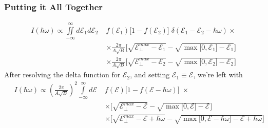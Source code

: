 \subsubsection{Putting it All Together}
\begin{align}
I(\hbar\omega) \propto \iint\limits_{-\infty}^{\infty} d\mathcal{E}_1 d\mathcal{E}_2 \;& f(\mathcal{E}_1) \Big[1-f(\mathcal{E}_2)\Big] \; \delta(\mathcal{E}_1 - \mathcal{E}_2 - \hbar\omega) \times \\ &\times \frac{2\pi}{A\sqrt{ B }}\Bigg[ \sqrt{ \mathcal{E}_{\perp}^{max}-\mathcal{E}_{1} } - \sqrt{ \max\big[0,\mathcal{E}_{1}\big]-\mathcal{E}_{1} } \Bigg] \\ 
&\times \frac{2\pi}{A\sqrt{ B }}\Bigg[ \sqrt{ \mathcal{E}_{\perp}^{max}-\mathcal{E}_{2} } - \sqrt{ \max\big[0,\mathcal{E}_{2}\big]-\mathcal{E}_{2} } \Bigg]
\label{eq:quadratic_intraband_putting_together}
\end{align}
After resolving the delta function for $\mathcal{E}_{2}$, and setting $\mathcal{E}_{1}\equiv\mathcal{E}$, we're left with
\begin{equation}
\boxed{\begin{aligned}
\quad  I(\hbar\omega) \propto \left( \frac{2\pi}{A\sqrt{ B }} \right)^{2} \int\limits_{-\infty}^{\infty} d\mathcal{E} \;& f(\mathcal{E}) \Big[1-f(\mathcal{E- \hbar\omega})\Big] \; \times \\ &\times \Bigg[ \sqrt{ \mathcal{E}_{\perp}^{max}-\mathcal{E} } - \sqrt{ \max\big[0,\mathcal{E}\big]-\mathcal{E} } \Bigg] \\ 
&\times \Bigg[ \sqrt{ \mathcal{E}_{\perp}^{max}-\mathcal{E} +\hbar\omega } - \sqrt{ \max\big[0,\mathcal{E-\hbar\omega}\big]-\mathcal{E} +\hbar\omega } \Bigg] 
\end{aligned}}
\label{eq:quadratic_intraband_final_expression}
\end{equation}
